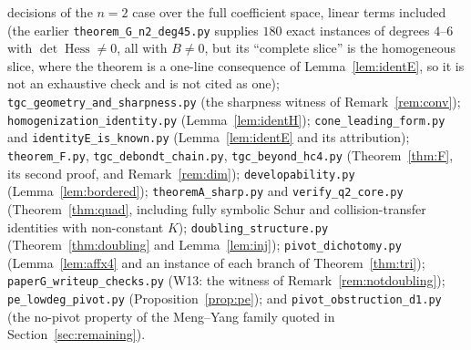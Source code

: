 \documentclass[11pt]{article}
\theoremstyle{plain}
\theoremstyle{definition}
\newcommand{\Hess}{\operatorname{Hess}}
\begin{document}
decisions of the $n=2$ case over the full coefficient space, linear terms
included (the earlier \texttt{theorem\_G\_n2\_deg45.py} supplies $180$
exact instances of degrees $4$--$6$ with $\det\Hess\ne0$, all with
$B\ne0$, but its ``complete slice'' is the homogeneous slice, where the
theorem is a one-line consequence of Lemma~\ref{lem:identE}, so it is not
an exhaustive check and is not cited as one);
\texttt{tgc\_geometry\_and\_sharpness.py} (the sharpness witness of
Remark~\ref{rem:conv}); \texttt{homogenization\_identity.py}
(Lemma~\ref{lem:identH}); \texttt{cone\_leading\_form.py} and
\texttt{identityE\_is\_known.py} (Lemma~\ref{lem:identE} and its
attribution); \texttt{theorem\_F.py}, \texttt{tgc\_debondt\_chain.py},
\texttt{tgc\_beyond\_hc4.py} (Theorem~\ref{thm:F}, its second proof, and
Remark~\ref{rem:dim}); \texttt{developability.py}
(Lemma~\ref{lem:bordered}); \texttt{theoremA\_sharp.py} and
\texttt{verify\_q2\_core.py} (Theorem~\ref{thm:quad}, including fully
symbolic Schur and collision-transfer identities with non-constant $K$);
\texttt{doubling\_structure.py} (Theorem~\ref{thm:doubling} and
Lemma~\ref{lem:inj}); \texttt{pivot\_dichotomy.py}
(Lemma~\ref{lem:affx4} and an instance of each branch of
Theorem~\ref{thm:tri}); \texttt{paperG\_writeup\_checks.py} (W13: the
witness of Remark~\ref{rem:notdoubling}); \texttt{pe\_lowdeg\_pivot.py}
(Proposition~\ref{prop:pe}); and \texttt{pivot\_obstruction\_d1.py} (the
no-pivot property of the Meng--Yang family quoted in
Section~\ref{sec:remaining}).
\end{document}

